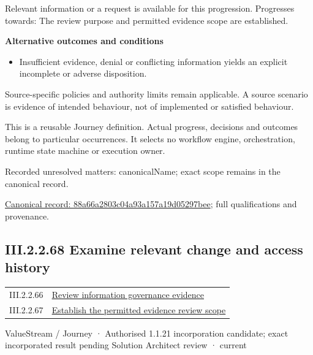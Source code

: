 Relevant information or a request is available for this progression. Progresses towards: The review purpose and permitted evidence scope are established.



\par\medskip\textbf{Alternative outcomes and conditions}\par


\begin{itemize}


\item Insufficient evidence, denial or conflicting information yields an explicit incomplete or adverse disposition.

\end{itemize}


Source-specific policies and authority limits remain applicable. A source scenario is evidence of intended behaviour, not of implemented or satisfied behaviour.



This is a reusable Journey definition. Actual progress, decisions and outcomes belong to particular occurrences. It selects no workflow engine, orchestration, runtime state machine or execution owner.


{\small Recorded unresolved matters: canonicalName; exact scope remains in the canonical record.}\par
{\footnotesize \href{../../../../continuum/strategy/value-stream/88a66a2803c04a93a157a19d05297bee.md}{Canonical record: 88a66a2803c04a93a157a19d05297bee}; full qualifications and provenance.}\par
\subsection*{III.2.2.68 Examine relevant change and access history}
\label{navigation:III.2.2.68}

\begin{longtable}{p{.22\linewidth}p{.73\linewidth}}
III.2.2.66 & \hyperref[element:558e014abfce4750996f92473380284d]{Review information governance evidence} \\
III.2.2.67 & \hyperref[element:88a66a2803c04a93a157a19d05297bee]{Establish the permitted evidence review scope} \\
\end{longtable}
\label{element:39211c37cd3c4d3a8cdfe49d044c7f43}
{\small ValueStream / Journey · Authorised 1.1.21 incorporation candidate; exact incorporated result pending Solution Architect review · current}\par

